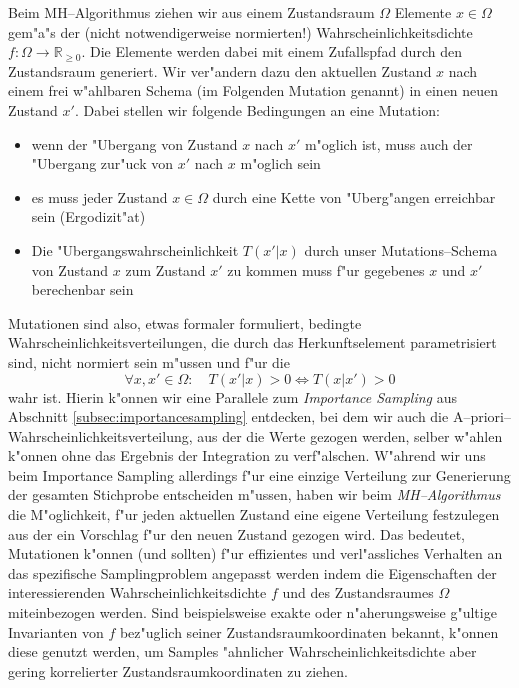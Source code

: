 	Beim MH--Algorithmus ziehen wir aus einem Zustandsraum $\Omega$ Elemente $x \in \Omega$ gem"a"s der (nicht notwendigerweise normierten!) Wahrscheinlichkeitsdichte $f : \Omega \rightarrow \mathbb{R}_{\geq 0}$. Die Elemente werden dabei mit einem Zufallspfad durch den Zustandsraum generiert. Wir ver"andern dazu den aktuellen Zustand $x$ nach einem frei w"ahlbaren Schema (im Folgenden Mutation genannt) in einen neuen Zustand $x'$.
	Dabei stellen wir folgende Bedingungen an eine Mutation:
	\begin{itemize}
		\item{wenn der "Ubergang von Zustand $x$ nach $x'$ m"oglich ist, muss auch der "Ubergang zur"uck von $x'$ nach $x$ m"oglich sein}
		\item{es muss jeder Zustand $x \in \Omega$ durch eine Kette von "Uberg"angen erreichbar sein (Ergodizit"at)}
		\item{Die "Ubergangswahrscheinlichkeit $T(x'|x)$ durch unser Mutations--Schema von Zustand $x$ zum Zustand $x'$ zu kommen muss f"ur gegebenes $x$ und $x'$ berechenbar sein}
	\end{itemize}
	Mutationen sind also, etwas formaler formuliert, bedingte Wahrscheinlichkeitsverteilungen, die durch das Herkunftselement parametrisiert sind, nicht normiert sein m"ussen und f"ur die
	$$\forall x,x'\in\Omega : \quad T(x'|x)>0 \Leftrightarrow T(x|x')>0$$
	wahr ist. Hierin k"onnen wir eine Parallele zum {\em Importance Sampling} aus Abschnitt \ref{subsec:importancesampling} entdecken, bei dem wir auch die A--priori--Wahr\-schein\-lich\-keits\-ver\-tei\-lung, aus der die Werte gezogen werden, selber w"ahlen k"onnen ohne das Ergebnis der Integration zu verf"alschen. W"ahrend wir uns beim Importance Sampling allerdings f"ur eine einzige Verteilung zur Generierung der gesamten Stichprobe entscheiden m"ussen, haben wir beim {\em MH--Algorithmus} die M"oglichkeit, f"ur jeden aktuellen Zustand eine eigene Verteilung festzulegen aus der ein Vorschlag f"ur den neuen Zustand gezogen wird.
	Das bedeutet, Mutationen k"onnen (und sollten) f"ur effizientes und verl"assliches Verhalten an das spezifische Samplingproblem angepasst werden indem die Eigenschaften der interessierenden Wahrscheinlichkeitsdichte $f$ und des Zustandsraumes $\Omega$ miteinbezogen werden. Sind beispielsweise exakte oder n"aherungsweise g"ultige Invarianten von $f$ bez"uglich seiner Zustandsraumkoordinaten bekannt, k"onnen diese genutzt werden, um Samples "ahnlicher Wahrscheinlichkeitsdichte aber gering korrelierter Zustandsraumkoordinaten zu ziehen.
	
